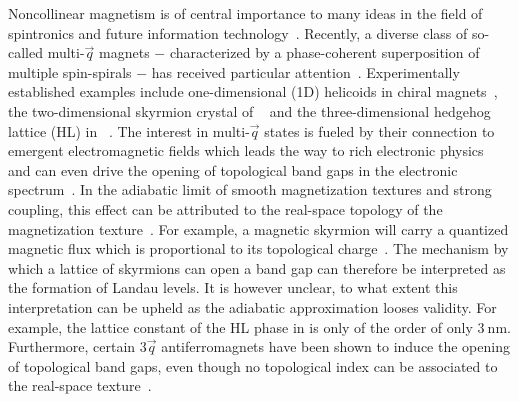 \documentclass[
    10pt,
    aps,
    prl,
    twocolumn,
    floatfix,
    superscriptaddress
]{revtex4-2}
\begin{document}
Noncollinear magnetism is of central importance to many ideas in the field of spintronics and future information technology~\cite{Vedmedenko2020, Back2020}.
Recently, a diverse class of so-called multi-$\vec{q}$ magnets $-$ characterized by a phase-coherent superposition of multiple spin-spirals $-$ has received particular attention~\cite{Okubo2012, Takagi2018, Hirschberger2019, Fujishiro2019, Okumura2020}.
Experimentally established examples include one-dimensional (1D) helicoids in chiral magnets~\cite{Adams2012,Janoschek2013}, the two-dimensional skyrmion crystal of ~\cite{Neubauer2009} and the three-dimensional hedgehog lattice (HL) in ~\cite{Tanigaki2015}.
The interest in multi-$\vec{q}$ states is fueled by their connection to emergent electromagnetic fields which leads the way to rich electronic physics~\cite{ Bliokh2005, Fujita2011}
and can even drive  the opening of topological band gaps in the electronic spectrum~\cite{Hamamoto2015, Goebel2017, Goebel2018}.
In the adiabatic limit of smooth magnetization textures and strong coupling, this effect can be attributed to the real-space topology of the magnetization texture~\cite{Bruno2004, EverschorSitte2014}.
For example, a magnetic skyrmion will carry a quantized magnetic flux which is proportional to its topological charge~\cite{Nagaosa2013}. 
The mechanism by which a lattice of skyrmions can open a band gap can therefore be interpreted as the formation of Landau levels.
It is however unclear, to what extent this interpretation can be upheld as the adiabatic approximation looses validity.
For example, the lattice constant of the HL phase in  is only of the order of only $\SI{3}{\nano\meter}$.
Furthermore, certain $3\vec{q}$ antiferromagnets have been shown to induce the opening of topological band gaps, even though no topological index can be associated to the real-space texture~\cite{Ndiaye2019, Feng2020}.
\end{document}
